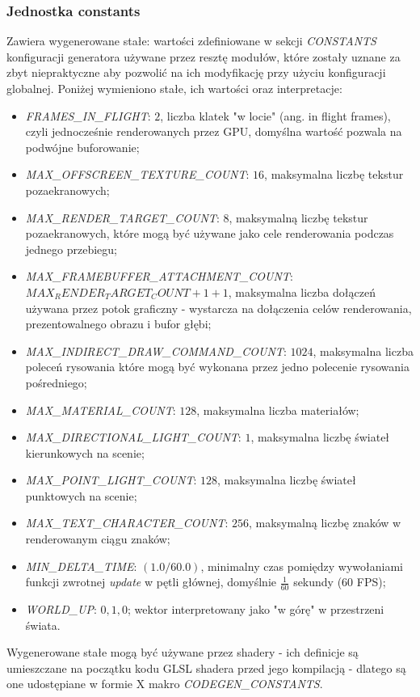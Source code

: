 \subsubsection{Jednostka constants}
Zawiera wygenerowane stałe: wartości zdefiniowane w sekcji \textit{CONSTANTS} konfiguracji generatora używane przez resztę modułów, które zostały uznane za zbyt niepraktyczne aby pozwolić na ich modyfikację przy użyciu konfiguracji globalnej.
Poniżej wymieniono stałe, ich wartości oraz interpretacje:
\begin{itemize}
	\item \textit{FRAMES\_IN\_FLIGHT}: $2$, liczba klatek "w locie" (ang. in flight frames), czyli jednocześnie renderowanych przez GPU, domyślna wartość pozwala na podwójne buforowanie; 
	\item \textit{MAX\_OFFSCREEN\_TEXTURE\_COUNT}: $16$, maksymalna liczbę tekstur pozaekranowych;
	\item \textit{MAX\_RENDER\_TARGET\_COUNT}: $8$, maksymalną liczbę tekstur pozaekranowych, które mogą być używane jako cele renderowania podczas jednego przebiegu; 
	\item \textit{MAX\_FRAMEBUFFER\_ATTACHMENT\_COUNT}: $MAX_RENDER_TARGET_COUNT + 1 + 1$, maksymalna liczba dołączeń używana przez potok graficzny - wystarcza na dołączenia celów renderowania, prezentowalnego obrazu i bufor głębi;
	\item \textit{MAX\_INDIRECT\_DRAW\_COMMAND\_COUNT}: $1024$, maksymalna liczba poleceń rysowania które mogą być wykonana przez jedno polecenie rysowania pośredniego;
	\item \textit{MAX\_MATERIAL\_COUNT}: $128$, maksymalna liczba materiałów;
	\item \textit{MAX\_DIRECTIONAL\_LIGHT\_COUNT}: $1$, maksymalna liczbę świateł kierunkowych na scenie;
	\item \textit{MAX\_POINT\_LIGHT\_COUNT}: $128$, maksymalna liczbę świateł punktowych na scenie;
	\item \textit{MAX\_TEXT\_CHARACTER\_COUNT}: $256$, maksymalną liczbę znaków w renderowanym ciągu znaków;
	\item \textit{MIN\_DELTA\_TIME}: $(1.0 / 60.0)$, minimalny czas pomiędzy wywołaniami funkcji zwrotnej \textit{update} w pętli głównej, domyślnie $\frac{1}{60}$ sekundy (60 FPS);
	\item \textit{WORLD\_UP}: $0, 1, 0$; wektor interpretowany jako "w górę" w przestrzeni świata.
\end{itemize}

Wygenerowane stałe mogą być używane przez shadery - ich definicje są umieszczane na początku kodu GLSL shadera przed jego kompilacją - dlatego są one udostępiane w formie X makro \textit{CODEGEN\_CONSTANTS}.


